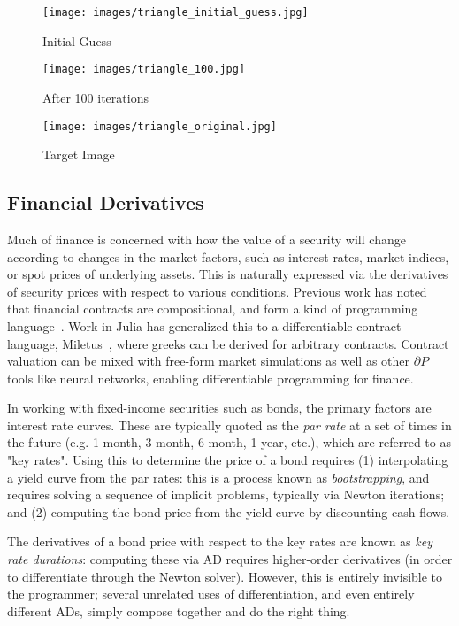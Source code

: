 \documentclass{juliacon}
\begin{document}
\begin{figure}[!htb]
  \texttt{[image: images/triangle\_initial\_guess.jpg]}
  \caption{Initial Guess}\label{fig:raytracer1}
\endminipage\hfill
{}
  \texttt{[image: images/triangle\_100.jpg]}
  \caption{After 100 iterations}\label{fig:raytracer2}
\endminipage\hfill
{}%
  \texttt{[image: images/triangle\_original.jpg]}
  \caption{Target Image}\label{fig:raytracer3}
\endminipage
\end{figure}


\subsection{Financial Derivatives}

Much of finance is concerned with how the value of a security will change according to changes in the market factors, such as interest rates, market indices, or spot prices of underlying assets. This is naturally expressed via the derivatives of security prices with respect to various conditions. Previous work has noted that financial contracts are compositional, and form a kind of programming language~\cite{jones2000composing,jones2003write}. Work in Julia has generalized this to a differentiable contract language, Miletus~\cite{Miletus.jl-2019}, where greeks can be derived for arbitrary contracts. Contract valuation can be mixed with free-form market simulations as well as other $\partial P$ tools like neural networks, enabling differentiable programming for finance.

In working with fixed-income securities such as bonds, the primary factors are interest rate curves. These are typically quoted as the \emph{par rate} at a set of times in the future (e.g. 1 month, 3 month, 6 month, 1 year, etc.), which are referred to as "key rates". Using this to determine the price of a bond requires (1) interpolating a yield curve from the par rates: this is a process known as \emph{bootstrapping}, and requires solving a sequence of implicit problems, typically via Newton iterations; and (2) computing the bond price from the yield curve by discounting cash flows.

The derivatives of a bond price with respect to the key rates are known as \emph{key rate durations}: computing these via AD requires higher-order derivatives (in order to differentiate through the Newton solver). However, this is entirely invisible to the programmer; several unrelated uses of differentiation, and even entirely different ADs, simply compose together and do the right thing.
\end{document}
